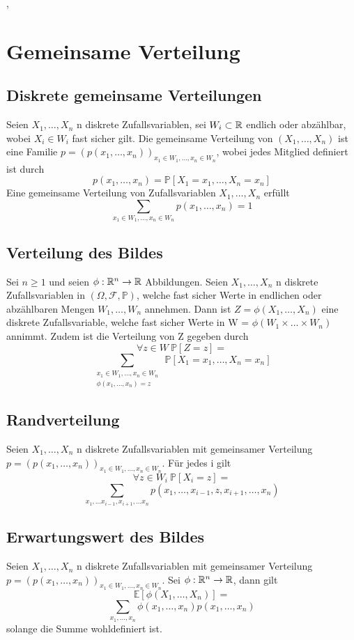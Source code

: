 \sep
\section{Gemeinsame Verteilung}
\subsection{Diskrete gemeinsame Verteilungen}
\Def[5.1] \newline
Seien \(X_1, \dots , X_n\) n diskrete Zufallsvariablen, sei \( W_i \subset \mathbb{R} \) endlich oder abzählbar, wobei \(X_i \in W_i\) fast sicher gilt. Die gemeinsame Verteilung von \((X_1, \dots , X_n)\) ist eine Familie \( p = (p(x_1, \dots , x_n))_{x_1 \in W_1, \dots ,x_n \in W_n}\), wobei jedes Mitglied definiert ist durch \[ p(x_1, \dots , x_n) = \mathbb{P}[X_1 = x_1 , \dots , X_n = x_n]\]
\Satz[5.2] \newline
Eine gemeinsame Verteilung von Zufallsvariablen \( X_1, \dots , X_n\) erfüllt \[ \sum_{x_1 \in W_1, \dots , x_n \in W_n } p(x_1, \dots, x_n ) = 1\]
\subsection{Verteilung des Bildes}
\Satz[5.3] \newline
Sei \( n \geq 1 \) und seien \( \phi : \mathbb{R}^n \rightarrow \mathbb{R} \) Abbildungen. Seien \(X_1, \dots, X_n\) n diskrete Zufallsvariablen in \( (\Omega, \mathcal{F}, \mathbb{P})\), welche fast sicher Werte in endlichen oder abzählbaren Mengen \(W_1, \dots , W_n\) annehmen. Dann ist \( Z = \phi(X_1, \dots , X_n)\) eine diskrete Zufallsvariable, welche fast sicher Werte in W = \(\phi(W_1 \times \dots \times W_n)\) annimmt. Zudem ist die Verteilung von Z gegeben durch \[ \forall z \in W \ \mathbb{P}[Z=z]= \] \[\sum_{\substack{x_1 \in W_1, \dots , x_n \in W_n \\ \phi(x_1, \dots , x_n) = z}} \ \mathbb{P}[X_1 = x_1 , \dots , X_n = x_n]\]
\subsection{Randverteilung}
\Satz[5.4] \newline 
Seien \(X_1, \dots , X_n\) n diskrete Zufallsvariablen mit gemeinsamer Verteilung \( p = (p(x_1, \dots , x_n ))_{x_1 \in W_1, \dots , x_n \in W_n}\). Für jedes i gilt \[ \forall z \in W_i \ \mathbb{P}[X_i = z] =\] \[ \sum_{x_1, \dots x_{i-1}, x_{i+1}, \dots x_n} p(x_1, \dots , x_{i-1}, z , x_{i+1}, \dots , x_n)\]
\subsection{Erwartungswert des Bildes}
\Satz[5.5] \newline
Seien \( X_1 , \dots , X_n \) n diskrete Zufallsvariablen mit gemeinsamer Verteilung \(p = (p(x_1, \dots , x_n))_{x_1 \in W_1, \dots , x_n \in W_n}\). Sei \(\phi: \mathbb{R}^n \rightarrow \mathbb{R} \), dann gilt \[ \mathbb{E}[\phi(X_1, \dots, X_n)] = \] \[\sum_{x_1, \dots , x_n } \phi(x_1, \dots , x_n)p(x_1, \dots , x_n)\] solange die Summe wohldefiniert ist. \newline
